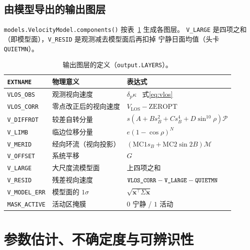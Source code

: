 \documentclass[11pt,a4paper]{ctexart}
\newcommand{\code}[1]{\texttt{\small #1}}
\newcommand{\vlos}{V_{\mathrm{LOS}}}
\newcommand{\Proj}{\mathcal{P}}
\newcommand{\Merid}{\mathcal{M}}
\begin{document}
\subsection{由模型导出的输出图层}
\code{models.VelocityModel.components()} 按表~\ref{tab:layers} 生成各图层。
\code{V\_LARGE} 是四项之和（即模型面），\code{V\_RESID} 是观测减去模型面后再扣掉
宁静日面均值（头卡 \code{QUIETMN}）。

\begin{table}[htbp]
\centering
\small
\caption{输出图层的定义（\code{output.LAYERS}）。}
\label{tab:layers}
\begin{tabular}{@{}lll@{}}
\toprule
\code{EXTNAME} & 物理意义 & 表达式 \\
\midrule
\code{VLOS\_OBS}   & 观测视向速度 & $\delta_p\kappa$ \ 式\eqref{eq:vlos} \\
\code{VLOS\_CORR}  & 零点改正后的视向速度 & $\vlos - \mathrm{ZEROPT}$ \\
\code{V\_DIFFROT}  & 较差自转分量 & $s(A+B s_B^2+C s_B^4+D\sin^{10}\!\rho)\Proj$ \\
\code{V\_LIMB}     & 临边位移分量 & $e(1-\cos\rho)^N$ \\
\code{V\_MERID}    & 经向环流（视向投影） & $(\mathrm{MC1}s_B+\mathrm{MC2}\sin2B)\Merid$ \\
\code{V\_OFFSET}   & 系统平移 & $G$ \\
\code{V\_LARGE}    & 大尺度流模型面 & 上四项之和 \\
\code{V\_RESID}    & 残差视向速度 & $\code{VLOS\_CORR}-\code{V\_LARGE}-\code{QUIETMN}$ \\
\code{V\_MODEL\_ERR} & 模型面的 $1\sigma$ & $\sqrt{\bm{x}^\top\Sigma\bm{x}}$ \\
\code{MASK\_ACTIVE} & 活动区掩膜 & $0$ 宁静 / $1$ 活动 \\
\bottomrule
\end{tabular}
\end{table}

\section{参数估计、不确定度与可辨识性}
\end{document}
